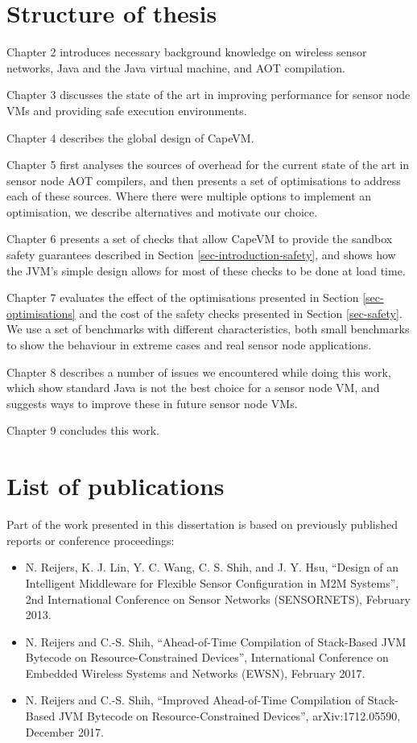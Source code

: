 \section{Structure of thesis}
Chapter 2 introduces necessary background knowledge on wireless sensor networks, Java and the Java virtual machine, and AOT compilation.

Chapter 3 discusses the state of the art in improving performance for sensor node VMs and providing safe execution environments.

Chapter 4 describes the global design of CapeVM.

Chapter 5 first analyses the sources of overhead for the current state of the art in sensor node AOT compilers, and then presents a set of optimisations to address each of these sources. Where there were multiple options to implement an optimisation, we describe alternatives and motivate our choice.

Chapter 6 presents a set of checks that allow CapeVM to provide the sandbox safety guarantees described in Section \ref{sec-introduction-safety}, and shows how the JVM's simple design allows for most of these checks to be done at load time.

Chapter 7 evaluates the effect of the optimisations presented in Section \ref{sec-optimisations} and the cost of the safety checks presented in Section \ref{sec-safety}. We use a set of benchmarks with different characteristics, both small benchmarks to show the behaviour in extreme cases and real sensor node applications.

Chapter 8 describes a number of issues we encountered while doing this work, which show standard Java is not the best choice for a sensor node VM, and suggests ways to improve these in future sensor node VMs.

Chapter 9 concludes this work.

\section{List of publications}
Part of the work presented in this dissertation is based on previously published reports or conference proceedings:

\begin{itemize}
    \item N. Reijers, K. J. Lin, Y. C. Wang, C. S. Shih, and J. Y. Hsu, “Design of an Intelligent Middleware for Flexible Sensor Configuration in M2M Systems”, 2nd International Conference on Sensor Networks (SENSORNETS), February 2013.
    \item N. Reijers and C.-S. Shih, “Ahead-of-Time Compilation of Stack-Based JVM Bytecode on Resource-Constrained Devices”, International Conference on Embedded Wireless Systems and Networks (EWSN), February 2017.
    \item N. Reijers and C.-S. Shih, “Improved Ahead-of-Time Compilation of Stack-Based JVM Bytecode on Resource-Constrained Devices”, arXiv:1712.05590, December 2017.
\end{itemize}

